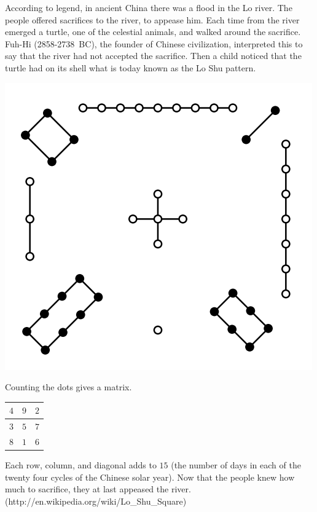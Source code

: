 According to legend, 
in ancient China there was a flood in the Lo river.
The people offered sacrifices to the river, 
to appease him.
Each time from the river emerged a turtle, one of the celestial animals, 
and walked around the sacrifice.
Fuh-Hi (2858-2738~BC), the founder of Chinese civilization,  
interpreted this to say that
the river had not accepted the sacrifice.  
Then a child noticed that the turtle had on its shell what is today
known as the Lo Shu pattern.
\begin{center}
  \includegraphics{LoShu.png}
\end{center}
Counting the dots gives a matrix.
\begin{center}
  \begin{tabular}{|c|c|c|}
    \hline
      $4$  &$9$  &$2$  \\ \hline
      $3$  &$5$  &$7$  \\ \hline
      $8$  &$1$  &$6$  \\ \hline    
  \end{tabular}
\end{center}
Each row, column, 
and diagonal adds to $15$
(the number of days in each of the twenty four cycles of the Chinese solar year).
Now that the people knew how much to sacrifice, they at last appeased the river.
(http://en.wikipedia.org/wiki/Lo_Shu_Square)

